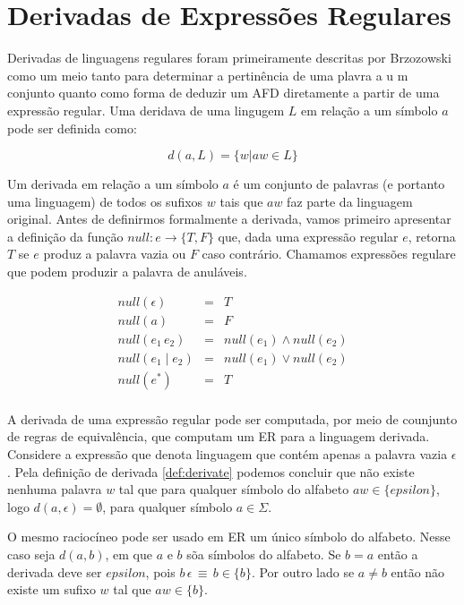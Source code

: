 \section{Derivadas de Expressões Regulares}

Derivadas de linguagens regulares foram primeiramente descritas por Brzozowski~\cite{Brzozowski64} como um meio tanto para determinar a
pertinência de uma plavra a u m conjunto quanto como forma de deduzir um AFD diretamente a partir de uma expressão regular.
Uma deridava de uma lingugem $L$ em relação a um símbolo $a$ pode ser definida como:

\begin{equation}
     d(a,L)  = \{w | aw \in L\}
     \label{def:derivate}
\end{equation}

Um derivada em relação a um símbolo $a$ é um conjunto de palavras (e portanto uma linguagem) de todos os sufixos $w$ tais que $aw$ faz parte da linguagem original. Antes de definirmos formalmente a derivada, vamos primeiro apresentar a definição da função $null : e \to \{T,F\}$ que,
dada uma expressão regular $e$, retorna $T$ se $e$ produz a palavra vazia ou $F$ caso contrário. Chamamos expressões regulare que podem
produzir a palavra de anuláveis.

\[
\begin{array}{lcl}
    null(\epsilon) & = & T\\
    null(a) & = & F\\
    null(e_1 \, e_2) & = & null(e_1) \wedge null(e_2)\\
    null(e_1 \;|\; e_2) & = & null(e_1) \vee null(e_2)\\
    null(e^*) & = & T \\
\end{array}
\]

A derivada de uma expressão regular pode ser computada, por meio de counjunto de regras de equivalência, que computam um ER para a linguagem derivada. Considere a expressão que denota linguagem que contém apenas a palavra  vazia $\epsilon$. Pela definição de derivada \ref{def:derivate} podemos concluir que não existe nenhuma palavra $w$ tal que para qualquer símbolo do alfabeto $aw \in \{epsilon\}$, logo $d(a,\epsilon) = \emptyset$, para qualquer símbolo $a \in \Sigma$.

O mesmo raciocíneo pode ser usado em ER um único símbolo do alfabeto. Nesse caso  seja $d(a,b)$, em que $a$ e $b$ sõa símbolos do alfabeto. Se $b=a$ então a derivada deve ser $epsilon$, pois $b\,\epsilon \,\equiv\, b \in \{b\}$. Por outro lado se $a\not = b$ então não existe um sufixo $w$ tal que $aw\in \{b\}$.


